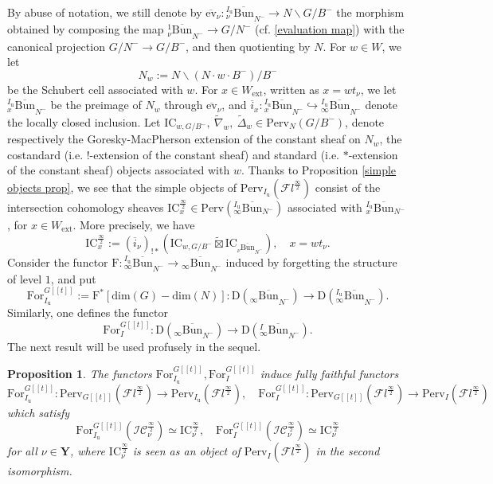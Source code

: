 \documentclass[11pt]{amsart}
\theoremstyle{plain}
\newtheorem{prop}[thm]{Proposition}
\theoremstyle{remark}
\numberwithin{equation}{section}
\begin{document}
	By abuse of notation, we still denote by $\overline{\mathrm{ev}}_\nu:{^{I_{\mathrm{u}}}_\nu\overline{\mathrm{Bun}}}_{N^-}\to N\backslash G/B^-$ the morphism obtained by composing the map ${^{1}_\nu\overline{\mathrm{Bun}}}_{N^-}\to  G/N^-$ (cf. \eqref{evaluation map}) with the canonical projection $G/N^-\to G/B^-$, and then quotienting by $N$. For $w\in W$, we let 
 $$N_w:=N\backslash(N\cdot w\cdot B^-)/B^-$$ 
 be the Schubert cell associated with $w$. For $x\in W_{\mathrm{ext}}$, written as $x=wt_\nu$, we let ${^{I_{\mathrm{u}}}_{x}\overline{\mathrm{Bun}}}_{N^-}$ be the preimage of $N_w$ through $\overline{\mathrm{ev}}_\nu$, and $\overline{i}_x:{^{I_{\mathrm{u}}}_x\overline{\mathrm{Bun}}}_{N^-}\hookrightarrow{^{I_{\mathrm{u}}}_\infty\overline{\mathrm{Bun}}}_{N^-}$ denote the locally closed inclusion. Let $\mathrm{IC}_{w,G/B^-},~\tilde{\nabla}_w,~\tilde{\Delta}_w\in \mathrm{Perv}_N(G/B^-)$, denote respectively the Goresky-MacPherson extension of the constant sheaf on $N_w$, the costandard (i.e. $!$-extension of the constant sheaf) and standard (i.e. $*$-extension of the constant sheaf) objects associated with $w$.  Thanks to Proposition \ref{simple objects prop}, we see that the simple objects of $\mathrm{Perv}_{I_{\mathrm{u}}}(\mathcal{F}l^{\frac{\infty}{2}})$ consist of the intersection cohomology sheaves $\mathrm{IC}_x^{\frac{\infty}{2}}\in\mathrm{Perv}(^{I_{\mathrm{u}}}_\infty\overline{\mathrm{Bun}}_{N^-})$ associated with  $^{I_{\mathrm{u}}}_x\overline{\mathrm{Bun}}_{N^-}$, for $x\in W_{\mathrm{ext}}$. More precisely, we have
	$$\mathrm{IC}_x^{\frac{\infty}{2}}:=(\overline{i}_\nu)_{!*}\left(\mathrm{IC}_{w,G/B^-}\widetilde{\boxtimes}\mathrm{IC}_{{_\nu\overline{\mathrm{Bun}}}_{N^-}}\right),\quad x=wt_\nu.$$
 Consider the functor $\mathrm{F}:{^{I_{\mathrm{u}}}_\infty\overline{\mathrm{Bun}}}_{N^-}\to {_\infty\overline{\mathrm{Bun}}}_{N^-}$
 induced by forgetting the structure of level $1$, and put  
$$\mathrm{For}^{G[[t]]}_{I_\mathrm{u}}:=\mathrm{F}^*[\mathrm{dim}(G)-\mathrm{dim}(N)]:\mathrm{D}({_\infty\overline{\mathrm{Bun}}}_{N^-})\to\mathrm{D}({^{I_{\mathrm{u}}}_\infty\overline{\mathrm{Bun}}}_{N^-}).$$
Similarly, one defines the functor
$$\mathrm{For}^{G[[t]]}_{I}:\mathrm{D}({_\infty\overline{\mathrm{Bun}}}_{N^-})\to\mathrm{D}({^{I}_\infty\overline{\mathrm{Bun}}}_{N^-}). $$
The next result will be used profusely in the sequel.
\begin{prop}\label{prop forget}
    The functors $\mathrm{For}^{G[[t]]}_{I_\mathrm{u}}, \mathrm{For}^{G[[t]]}_{I}$ induce fully faithful functors
    $$\mathrm{For}^{G[[t]]}_{I_\mathrm{u}}:\mathrm{Perv}_{G[[t]]}(\mathcal{F}l^{\frac{\infty}{2}})\to \mathrm{Perv}_{I_\mathrm{u}}(\mathcal{F}l^{\frac{\infty}{2}}),\quad \mathrm{For}^{G[[t]]}_{I}:\mathrm{Perv}_{G[[t]]}(\mathcal{F}l^{\frac{\infty}{2}})\to \mathrm{Perv}_{I}(\mathcal{F}l^{\frac{\infty}{2}})$$
    which satisfy
    $$\mathrm{For}^{G[[t]]}_{I_\mathrm{u}}(\mathcal{IC}_\nu^\frac{\infty}{2})\simeq \mathrm{IC}_\nu^\frac{\infty}{2},\quad \mathrm{For}^{G[[t]]}_{I}(\mathcal{IC}_\nu^\frac{\infty}{2})\simeq \mathrm{IC}_\nu^\frac{\infty}{2}$$
    for all $\nu\in\mathbf{Y}$, where $\mathrm{IC}_\nu^\frac{\infty}{2}$ is seen as an object of $\mathrm{Perv}_{I}(\mathcal{F}l^{\frac{\infty}{2}})$ in the second isomorphism.
\end{prop}
\end{document}
